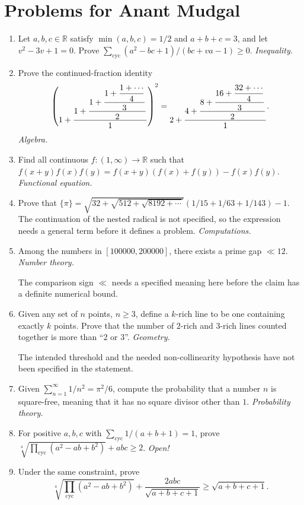 \documentclass[11pt,a4paper]{article}
\begin{document}
\section*{Problems for Anant Mudgal}
\begin{enumerate}[label=P\arabic*.]
\item[$\mathrm{P1}^{***}$.] Let $a,b,c\in\mathbb R$ satisfy
$\min(a,b,c)=1/2$ and $a+b+c=3$, and let $v^2-3v+1=0$.
Prove $\sum_{\mathrm{cyc}}(a^2-bc+1)/(bc+va-1)\geq0$. \emph{Inequality.}
\item[$\mathrm{P2}^{*}$.] Prove the continued-fraction identity
\[
\left(\vcenter{\hbox{$\displaystyle 1+\dfrac{1+\dfrac{1+\dfrac{1+\dfrac{1+\cdots}{4}}{3}}{2}}{1}$}}\right)^2
=\vcenter{\hbox{$\displaystyle 2+\dfrac{4+\dfrac{8+\dfrac{16+\dfrac{32+\cdots}{4}}{3}}{2}}{1}$}}.
\]
\emph{Algebra.}
\setcounter{enumi}{2}\item Find all continuous $f:(1,\infty)\to\mathbb R$ such that
$f(x+y)f(x)f(y)=f(x+y)(f(x)+f(y))-f(x)f(y)$.
\emph{Functional equation.}
\setcounter{enumi}{3}\item Prove that
$\{\pi\}=\sqrt{32+\sqrt{512+\sqrt{8192+\cdots}}}
(1/15+1/63+1/143)-1$. The continuation of the nested radical is not
specified, so the expression needs a general term before it defines a problem.
\emph{Computations.}
\item Among the numbers in $[100000,200000]$, there exists a prime gap $\ll12$.
\emph{Number theory.}

The comparison sign $\ll$ needs a specified meaning here before the claim has a
definite numerical bound.
\item Given any set of $n$ points, $n\geq3$, define a $k$-rich line to be one containing exactly $k$ points.
Prove that the number of $2$-rich and $3$-rich lines counted together is more than ``$2$ or $3$''.
\emph{Geometry.}

The intended threshold and the needed non-collinearity hypothesis have not been
specified in the statement.
\setcounter{enumi}{6}\item Given $\sum_{n=1}^\infty1/n^2=\pi^2/6$, compute the probability that a number $n$ is square-free,
meaning that it has no square divisor other than $1$. \emph{Probability theory.}
\item For positive $a,b,c$ with $\sum_{\mathrm{cyc}}1/(a+b+1)=1$, prove
$\sqrt[4]{\prod_{\mathrm{cyc}}(a^2-ab+b^2)}+abc\geq2$. \emph{Open!}
\item Under the same constraint, prove
\[
\sqrt[4]{\prod_{\mathrm{cyc}}(a^2-ab+b^2)}
+\frac{2abc}{\sqrt{a+b+c+1}}\geq\sqrt{a+b+c+1}.
\]
\end{enumerate}
\end{document}

